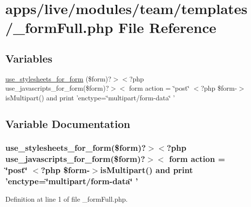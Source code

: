 \hypertarget{__form_full_8php}{\section{apps/live/modules/team/templates/\-\_\-form\-Full.php File Reference}
\label{__form_full_8php}
}
\subsection*{Variables}
\begin{DoxyCompactItemize}
\item 
\hyperlink{__form_full_8php_a00a269e565f040b15540e79f3fb02a19}{use\-\_\-stylesheets\-\_\-for\-\_\-form} (\$form)?$>$$<$?php use\-\_\-javascripts\-\_\-for\-\_\-form(\$form)?$>$$<$ form action = \char`\"{}post\char`\"{} $<$?php \$form-\/$>$is\-Multipart() and print 'enctype=\char`\"{}multipart/form-\/data\char`\"{} '
\end{DoxyCompactItemize}


\subsection{Variable Documentation}
\hypertarget{__form_full_8php_a00a269e565f040b15540e79f3fb02a19}{
\subsubsection[{use\-\_\-stylesheets\-\_\-for\-\_\-form}]{\setlength{\rightskip}{0pt plus 5cm}use\-\_\-stylesheets\-\_\-for\-\_\-form(\$form)?$>$$<$?php use\-\_\-javascripts\-\_\-for\-\_\-form(\$form)?$>$$<$ form action = \char`\"{}post\char`\"{} $<$?php \$form-\/$>$is\-Multipart() and print 'enctype=\char`\"{}multipart/form-\/data\char`\"{} '}}\label{__form_full_8php_a00a269e565f040b15540e79f3fb02a19}


Definition at line 1 of file \-\_\-form\-Full.\-php.

